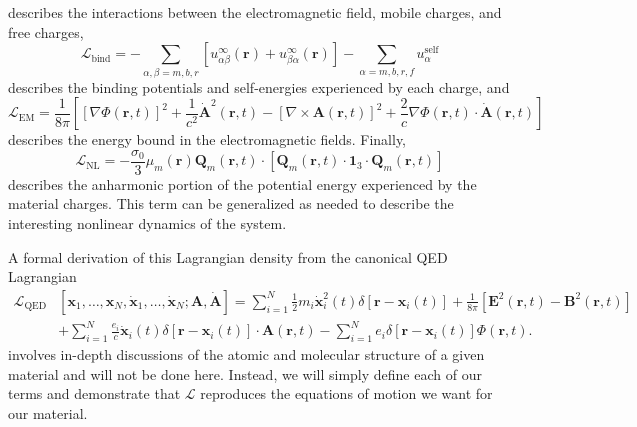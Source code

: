 \documentclass{article}
\begin{document}
describes the interactions between the electromagnetic field, mobile charges, and free charges,
\begin{equation}
\mathcal{L}_\mathrm{bind} = -\sum_{\alpha,\beta = m,b,r}\left[u_{\alpha\beta}^\infty(\mathbf{r}) + u_{\beta\alpha}^\infty(\mathbf{r})\right] - \sum_{\alpha = m,b,r,f}u_\alpha^\mathrm{self}
\end{equation}
describes the binding potentials and self-energies experienced by each charge, and
\begin{equation}
\mathcal{L}_\mathrm{EM} = \frac{1}{8\pi}\left[\left[\nabla\Phi(\mathbf{r},t)\right]^2 + \frac{1}{c^2}\dot{\mathbf{A}}^2(\mathbf{r},t) - \left[\nabla\times\mathbf{A}(\mathbf{r},t)\right]^2 + \frac{2}{c}\nabla\Phi(\mathbf{r},t)\cdot\dot{\mathbf{A}}(\mathbf{r},t)\right]
\end{equation}
describes the energy bound in the electromagnetic fields. Finally, 
\begin{equation}
\mathcal{L}_\mathrm{NL} = - \frac{\sigma_0}{3}\mu_m(\mathbf{r})\mathbf{Q}_m(\mathbf{r},t)\cdot\left[\mathbf{Q}_m(\mathbf{r},t)\cdot\bm{1}_3\cdot\mathbf{Q}_m(\mathbf{r},t)\right]
\end{equation}
describes the anharmonic portion of the potential energy experienced by the material charges. This term can be generalized as needed to describe the interesting nonlinear dynamics of the system.

A formal derivation of this Lagrangian density from the canonical QED Lagrangian
\begin{equation}\label{eq:lagrangianDensityQED}
\begin{split}
\mathcal{L}_\mathrm{QED}&\left[\mathbf{x}_1,\ldots,\mathbf{x}_N,\dot{\mathbf{x}}_1,\ldots,\dot{\mathbf{x}}_N;\mathbf{A},\dot{\mathbf{A}}\right] = \sum_{i = 1}^N\frac{1}{2}m_i\dot{\mathbf{x}}_i^2(t)\delta[\mathbf{r} - \mathbf{x}_i(t)] + \frac{1}{8\pi}\left[\mathbf{E}^2(\mathbf{r},t) - \mathbf{B}^2(\mathbf{r},t)\right]\\
&+ \sum_{i = 1}^N\frac{e_i}{c}\dot{\mathbf{x}}_i(t)\delta[\mathbf{r} - \mathbf{x}_i(t)]\cdot\mathbf{A}(\mathbf{r},t) - \sum_{i = 1}^Ne_i\delta[\mathbf{r} - \mathbf{x}_i(t)]\Phi(\mathbf{r},t).
\end{split}
\end{equation}
involves in-depth discussions of the atomic and molecular structure of a given material and will not be done here. Instead, we will simply define each of our terms and demonstrate that $\mathcal{L}$ reproduces the equations of motion we want for our material.
\end{document}
